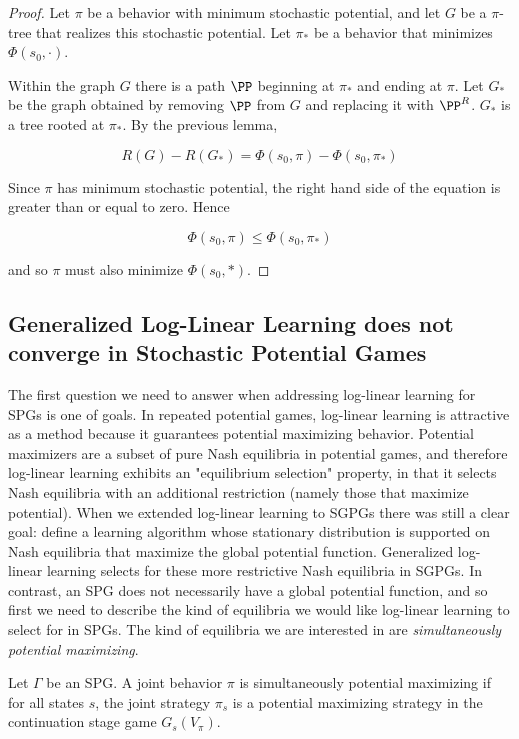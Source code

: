 \begin{proof}
Let $\pi$ be a behavior with minimum stochastic potential, and let $G$ be a $\pi$-tree that realizes this stochastic potential. Let $\pi_*$ be a behavior that minimizes $\Phi(s_0, \cdot)$.

Within the graph $G$ there is a path $\PP$ beginning at $\pi_*$ and ending at $\pi$. Let $G_*$ be the graph obtained by removing $\PP$ from $G$ and replacing it with $\PP^R$. $G_*$ is a tree rooted at $\pi_*$. By the previous lemma,

$$
R(G) - R(G_*) = \Phi(s_0, \pi) - \Phi(s_0, \pi_*)
$$

Since $\pi$ has minimum stochastic potential, the right hand side of the equation is greater than or equal to zero. Hence

$$
\Phi(s_0, \pi) \leq \Phi(s_0, \pi_*)
$$

and so $\pi$ must also minimize $\Phi(s_0, *)$.
\end{proof}



\subsection{Generalized Log-Linear Learning does not converge in Stochastic Potential Games}

The first question we need to answer when addressing log-linear learning for SPGs is one of goals. In repeated potential games, log-linear learning is attractive as a method because it guarantees potential maximizing behavior. Potential maximizers are a subset of pure Nash equilibria in potential games, and therefore log-linear learning exhibits an "equilibrium selection" property, in that it selects Nash equilibria with an additional restriction (namely those that maximize potential). When we extended log-linear learning to SGPGs there was still a clear goal: define a learning algorithm whose stationary distribution is supported on Nash equilibria that maximize the global potential function. Generalized log-linear learning selects for these more restrictive Nash equilibria in SGPGs. In contrast, an SPG does not necessarily have a global potential function, and so first we need to describe the kind of equilibria we would like log-linear learning to select for in SPGs. The kind of equilibria we are interested in are {\em simultaneously potential maximizing}.

\begin{mydef}
Let $\Gamma$ be an SPG. A joint behavior $\pi$ is simultaneously potential maximizing if for all states $s$, the joint strategy $\pi_s$ is a potential maximizing strategy in the continuation stage game $G_s(V_{\pi})$. 
\end{mydef}

